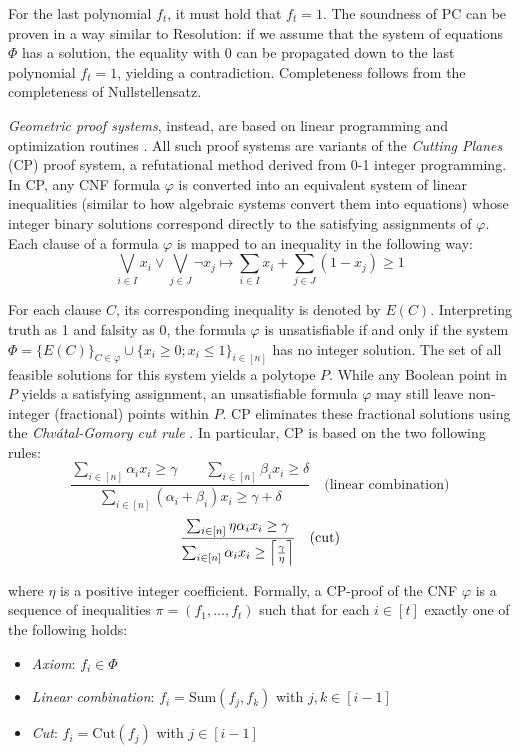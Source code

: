 For the last polynomial $f_t$, it must hold that $f_t = 1$. The soundness of PC can be proven in a way similar to Resolution: if we assume that the system of equations $\Phi$ has a solution, the equality with 0 can be propagated down to the last polynomial $f_t = 1$, yielding a contradiction. Completeness follows from the completeness of Nullstellensatz.

\textit{Geometric proof systems}, instead, are based on linear programming and optimization routines \cite{chvatal, gomory,jukna,kraj_book}. All such proof systems are variants of the \textit{Cutting Planes} (CP) proof system, a refutational method derived from 0-1 integer programming. In CP, any CNF formula $\varphi$ is converted into an equivalent system of linear inequalities (similar to how algebraic systems convert them into equations) whose integer binary solutions correspond directly to the satisfying assignments of $\varphi$. Each clause of a formula $\varphi$ is mapped to an inequality in the following way:
\begin{equation}
    \bigvee_{i \in I} x_i \lor \bigvee_{j \in J} \lnot x_j \mapsto \sum_{i \in I} x_i + \sum_{j \in J} (1-x_j) \geq 1
\end{equation}

For each clause $C$, its corresponding inequality is denoted by $E(C)$. Interpreting truth as 1 and falsity as 0, the formula $\varphi$ is unsatisfiable if and only if the system $\Phi  = \{E(C)\}_{C \in \varphi} \cup \{x_i \geq 0; x_i \leq 1\}_{i \in [n]}$ has no integer solution. The set of all feasible solutions for this system yields a polytope $P$. While any Boolean point in $P$ yields a satisfying assignment, an unsatisfiable formula $\varphi$ may still leave non-integer (fractional) points within $P$. CP eliminates these fractional solutions using the \textit{Chvátal-Gomory cut rule} \cite{chvatal, gomory}. In particular, CP is based on the two following rules:
\[\dfrac{\sum_{i \in [n]} \alpha_i x_i \geq \gamma \qquad \sum_{i \in [n]} \beta_{i} x_{i} \geq \delta}{\sum_{i \in [n]} (\alpha_i + \beta_i) x_i \geq \gamma + \delta} \quad \text{(linear combination)}\]
\[\dfrac{\sum_{i \in [n]}  \eta\alpha_i x_i \geq \gamma}{\sum_{i \in [n]} \alpha_ix_i \geq \left \lceil \frac{\gamma}{\eta} \right \rceil} \quad \text{(cut)}\]

where $\eta$ is a positive integer coefficient. Formally, a CP-proof of the CNF $\varphi$ is a sequence of inequalities $\pi = (f_1, \ldots, f_t)$ such that for each $i \in [t]$ exactly one of the following holds:
\begin{itemize}
    \item \textit{Axiom}: $f_i \in \Phi$
    \item \textit{Linear combination}: $f_i = \mathrm{Sum}(f_j, f_k)$ with $j,k \in [i-1]$
    \item \textit{Cut}: $f_i = \mathrm{Cut}(f_j)$ with $j \in [i-1]$
\end{itemize}

